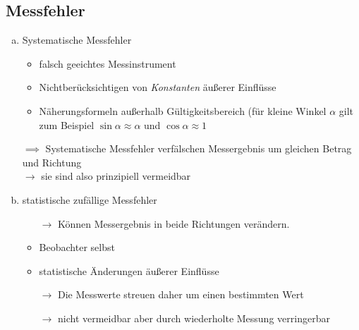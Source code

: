 \documentclass[a4paper,10pt]{scrartcl}
\begin{document}
\subsection{Messfehler}
\begin{enumerate}[a)]
\item Systematische Messfehler
\begin{itemize}
\item falsch geeichtes Messinstrument
\item Nichtberücksichtigen von \emph{Konstanten} äußerer Einflüsse
\item Näherungsformeln außerhalb Gültigkeitsbereich (für kleine Winkel $\alpha$ gilt zum Beispiel $\sin \alpha \approx \alpha$ und $\cos \alpha \approx 1$
\end{itemize}
$\implies$ Systematische Messfehler verfälschen Messergebnis um gleichen Betrag und Richtung \\
$\rightarrow$ sie sind also prinzipiell vermeidbar
\item statistische zufällige Messfehler
\begin{itemize}
\item[$\rightarrow$] Können Messergebnis in beide Richtungen verändern.
\item Beobachter selbst 
\item statistische Änderungen äußerer Einflüsse
\item[$\rightarrow$] Die Messwerte streuen daher um einen bestimmten Wert
\item[$\rightarrow$] nicht vermeidbar aber durch wiederholte Messung verringerbar
\end{itemize} 
\end{enumerate}
\end{document}
